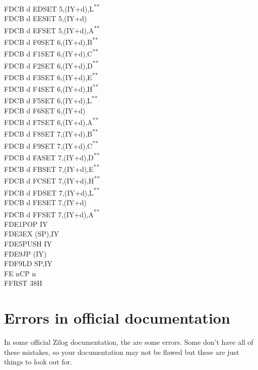 \documentclass[twoside,openright,a4paper]{book}
\newcommand{\UNDOC}{\textnormal{\textsuperscript{**}}}
\begin{document}
\begin{multicols}{3}
{\begin{tabbing}
	FDCB d ED\>SET 5,(IY+d),L\UNDOC\\
	FDCB d EE\>SET 5,(IY+d)\\
	FDCB d EF\>SET 5,(IY+d),A\UNDOC\\
	FDCB d F0\>SET 6,(IY+d),B\UNDOC\\
	FDCB d F1\>SET 6,(IY+d),C\UNDOC\\
	FDCB d F2\>SET 6,(IY+d),D\UNDOC\\
	FDCB d F3\>SET 6,(IY+d),E\UNDOC\\
	FDCB d F4\>SET 6,(IY+d),H\UNDOC\\
	FDCB d F5\>SET 6,(IY+d),L\UNDOC\\
	FDCB d F6\>SET 6,(IY+d)\\
	FDCB d F7\>SET 6,(IY+d),A\UNDOC\\
	FDCB d F8\>SET 7,(IY+d),B\UNDOC\\
	FDCB d F9\>SET 7,(IY+d),C\UNDOC\\
	FDCB d FA\>SET 7,(IY+d),D\UNDOC\\
	FDCB d FB\>SET 7,(IY+d),E\UNDOC\\
	FDCB d FC\>SET 7,(IY+d),H\UNDOC\\
	FDCB d FD\>SET 7,(IY+d),L\UNDOC\\
	FDCB d FE\>SET 7,(IY+d)\\
	FDCB d FF\>SET 7,(IY+d),A\UNDOC\\
	FDE1\>POP IY\\
	FDE3\>EX (SP),IY\\
	FDE5\>PUSH IY\\
	FDE9\>JP (IY)\\
	FDF9\>LD SP,IY\\
	FE n\>CP n\\
	FF\>RST 38H
\end{tabbing}
}
\end{multicols}
\normalsize



\chapter{Errors in official documentation}


In some official Zilog documentation, the are some errors. Some don't have all of these mistakes, so your documentation may not be flawed but these are just things to look out for.
\end{document}

